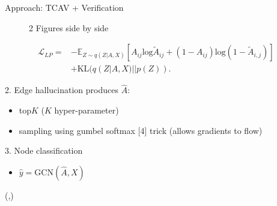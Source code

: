 \documentclass[final]{beamer}
\begin{document}
\begin{frame}[fragile]{}
\begin{textblock}{\colwidth}
\begin{paddedBlock}{Approach: TCAV + Verification}
\begin{figure}%
    \centering
    \qquad
    \caption{2 Figures side by side}%
    \label{fig:example}%
\end{figure}


\begin{align*}
\mathcal{L}_{LP}=&-\mathbb{E}_{Z\sim q(Z|A,X)}[A_{ij}\mathrm{log}\tilde{A}_{ij}+(1-A_{ij})\mathrm{log}(1-\tilde{A}_{i,j})]\\
&+\mathrm{KL}(q(Z|A,X)||p(Z)).
\end{align*}

\alert{2. Edge hallucination}
  produces $\hat{A}$:
  \begin{itemize}
    \item top$K$ ($K$ hyper-parameter)
    \item sampling using gumbel softmax [4] trick (allows gradients to flow)
  \end{itemize}
\alert{3. Node classification}
\begin{itemize}
	\item $\hat{y} = \mathrm{GCN}(\hat{A}, X)$
\end{itemize}

\end{paddedBlock}
\end{textblock}


\begin{textblock}{\colwidth}(\thirdcolpos,\vstartCols)


\end{textblock}
\end{frame}
\end{document}
